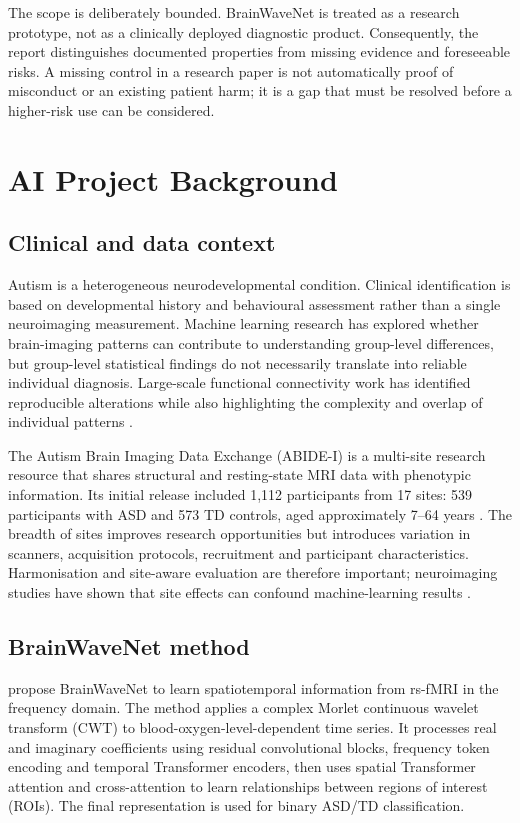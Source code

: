 \documentclass[11pt,a4paper]{article}
\begin{document}
The scope is deliberately bounded. BrainWaveNet is treated as a research prototype, not as a clinically deployed diagnostic product. Consequently, the report distinguishes documented properties from missing evidence and foreseeable risks. A missing control in a research paper is not automatically proof of misconduct or an existing patient harm; it is a gap that must be resolved before a higher-risk use can be considered.

\section{AI Project Background}
\subsection{Clinical and data context}
Autism is a heterogeneous neurodevelopmental condition. Clinical identification is based on developmental history and behavioural assessment rather than a single neuroimaging measurement. Machine learning research has explored whether brain-imaging patterns can contribute to understanding group-level differences, but group-level statistical findings do not necessarily translate into reliable individual diagnosis. Large-scale functional connectivity work has identified reproducible alterations while also highlighting the complexity and overlap of individual patterns \parencite{holiga2019}.

The Autism Brain Imaging Data Exchange (ABIDE-I) is a multi-site research resource that shares structural and resting-state MRI data with phenotypic information. Its initial release included 1,112 participants from 17 sites: 539 participants with ASD and 573 TD controls, aged approximately 7--64 years \parencite{dimartino2014,abidewebsite}. The breadth of sites improves research opportunities but introduces variation in scanners, acquisition protocols, recruitment and participant characteristics. Harmonisation and site-aware evaluation are therefore important; neuroimaging studies have shown that site effects can confound machine-learning results \parencite{abraham2017,abideharmonization2022}.

\subsection{BrainWaveNet method}
\textcite{jeong2024} propose BrainWaveNet to learn spatiotemporal information from rs-fMRI in the frequency domain. The method applies a complex Morlet continuous wavelet transform (CWT) to blood-oxygen-level-dependent time series. It processes real and imaginary coefficients using residual convolutional blocks, frequency token encoding and temporal Transformer encoders, then uses spatial Transformer attention and cross-attention to learn relationships between regions of interest (ROIs). The final representation is used for binary ASD/TD classification.
\end{document}
